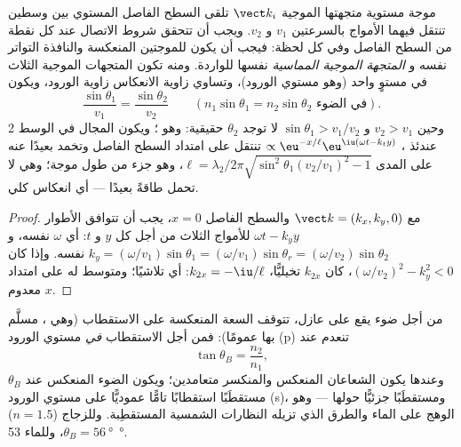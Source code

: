 \begin{theorem}\label{thm:b2:wave-interfaces:snell}
موجة مستوية متجهتها الموجية $\vect k_i$ تلقى السطح الفاصل المستوي بين
وسطين تنتقل فيهما الأمواج بالسرعتين $v_1$ و $v_2$. ويجب أن تتحقق شروط
الاتصال عند كل نقطة من السطح الفاصل وفي كل لحظة:
فيجب أن يكون للموجتين المنعكسة والنافذة التواتر نفسه و
\emph{المتجهة الموجية المماسية} نفسها للواردة. ومنه تكون
المتجهات الموجية الثلاث في مستوٍ واحد (وهو مستوي الورود)، وتساوي زاوية
الانعكاس زاوية الورود، ويكون
\[
\frac{\sin\theta_1}{v_1} = \frac{\sin\theta_2}{v_2} \qquad (n_1\sin\theta_1 = n_2\sin\theta_2 \text{ في الضوء}) .
\]
وحين $v_2 > v_1$ و $\sin\theta_1 > v_1/v_2$ لا توجد $\theta_2$ حقيقية:
وهو \emph{}؛ ويكون المجال في الوسط 2 عندئذ
\emph{}، $\propto\eu^{-x/\ell}\eu^{\iu(\omega t - k_ty)}$ تنتقل
على امتداد السطح الفاصل وتخمد بعيدًا عنه على المدى $\ell = \lambda_2/2\pi
\sqrt{\sin^2\theta_1(v_2/v_1)^2 - 1}$، وهو جزء من طول موجة؛ وهي
لا تحمل طاقةً بعيدًا --- أي انعكاس كلي.
\end{theorem}

\begin{proof}
مع $\vect k = (k_x, k_y, 0)$ والسطح الفاصل $x = 0$، يجب أن تتوافق الأطوار
$\omega t - k_yy$ للأمواج الثلاث من أجل كل $y$ و $t$: أي $\omega$ نفسه، و
$k_y = (\omega/v_1)\sin\theta_1 = (\omega/v_1)\sin\theta_r = (\omega/v_2)\sin
\theta_2$ نفسه. وإذا كان $(\omega/v_2)^2 - k_y^2 < 0$، كان $k_{2x}$ تخيليًّا، $k_{2x} = -\iu/\ell$:
أي تلاشيًا؛ ومتوسط  له على امتداد $x$ معدوم.
\end{proof}

\begin{proposition}\label{prop:b2:wave-interfaces:brewster}
من أجل ضوء يقع على عازل، تتوقف السعة المنعكسة على
الاستقطاب (وهي ، مسلَّم بها عمومًا): فمن أجل
الاستقطاب \emph{في} مستوي الورود (p) تنعدم عند
\emph{}
\[
\tan\theta_B = \frac{n_2}{n_1} ,
\]
وعندها يكون الشعاعان المنعكس والمنكسر متعامدين؛
ويكون الضوء المنعكس عند $\theta_B$ مستقطَبًا استقطابًا تامًّا عموديًّا على
مستوي الورود (s)، ومستقطَبًا جزئيًّا حولها --- وهو الوهج على
الماء والطرق الذي تزيله النظارات الشمسية المستقطِبة. وللزجاج ($n = 1.5$)
$\theta_B = \qty{56}{\degree}$، وللماء \qty{53}{\degree}.
\end{proposition}

